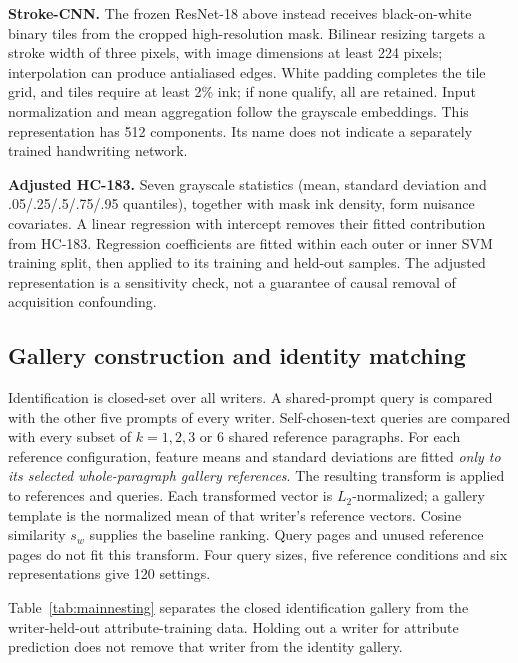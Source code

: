 \documentclass[ASNA,twocolumn]{USG}
\begin{document}
\textbf{Stroke-CNN.} The frozen ResNet-18 above instead receives black-on-white binary tiles from the cropped high-resolution mask. Bilinear resizing targets a stroke width of three pixels, with image dimensions at least 224 pixels; interpolation can produce antialiased edges. White padding completes the tile grid, and tiles require at least 2\% ink; if none qualify, all are retained. Input normalization and mean aggregation follow the grayscale embeddings. This representation has 512 components. Its name does not indicate a separately trained handwriting network.

\textbf{Adjusted HC-183.} Seven grayscale statistics (mean, standard deviation and .05/.25/.5/.75/.95 quantiles), together with mask ink density, form nuisance covariates. A linear regression with intercept removes their fitted contribution from HC-183. Regression coefficients are fitted within each outer or inner SVM training split, then applied to its training and held-out samples. The adjusted representation is a sensitivity check, not a guarantee of causal removal of acquisition confounding.

\subsection{Gallery construction and identity matching}

Identification is closed-set over all writers. A shared-prompt query is compared with the other five prompts of every writer. Self-chosen-text queries are compared with every subset of $k=1,2,3$ or 6 shared reference paragraphs. For each reference configuration, feature means and standard deviations are fitted \emph{only to its selected whole-paragraph gallery references}. The resulting transform is applied to references and queries. Each transformed vector is $L_2$-normalized; a gallery template is the normalized mean of that writer's reference vectors. Cosine similarity $s_w$ supplies the baseline ranking. Query pages and unused reference pages do not fit this transform. Four query sizes, five reference conditions and six representations give 120 settings.

Table~\ref{tab:mainnesting} separates the closed identification gallery from the writer-held-out attribute-training data. Holding out a writer for attribute prediction does not remove that writer from the identity gallery.
\end{document}
